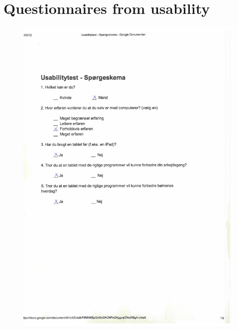 \section{Questionnaires from usability}
\label{questionnaires}

\begin{figure}[H]
	\centering
		\includegraphics{Appendix/demo_d1.pdf}
	\label{fig:demo_t1}
\end{figure}

